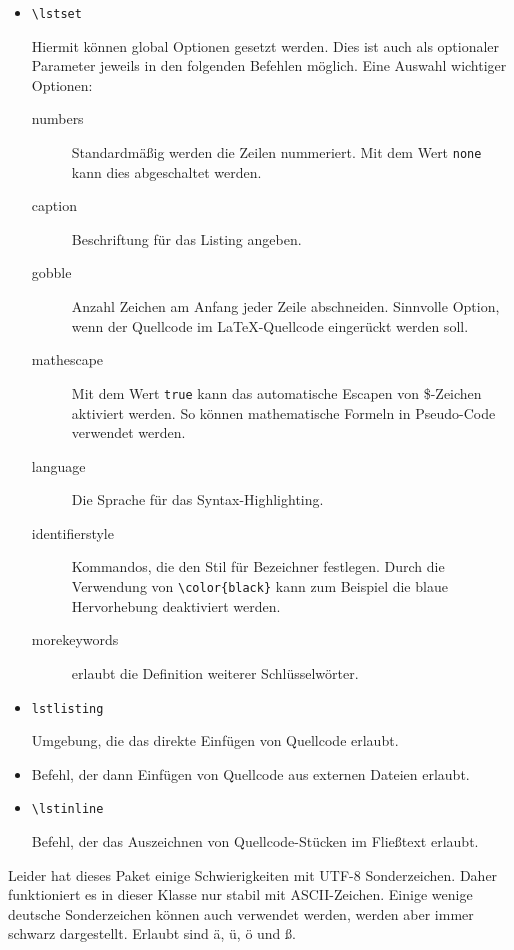 \documentclass{exercise}
\begin{document}
    \begin{itemize}
      \item \lstinline{\lstset}
      
        Hiermit können global Optionen gesetzt werden. Dies ist auch als
        optionaler Parameter jeweils in den folgenden Befehlen möglich. Eine
        Auswahl wichtiger Optionen:
        \begin{description}
          \item[numbers] Standardmäßig werden die Zeilen nummeriert. Mit dem
            Wert \texttt{none} kann dies abgeschaltet werden.
          \item[caption] Beschriftung für das Listing angeben.
          \item[gobble] Anzahl Zeichen am Anfang jeder Zeile abschneiden.
            Sinnvolle Option, wenn der Quellcode im
            \LaTeX{}-Quellcode eingerückt werden soll.
          \item[mathescape] Mit dem Wert \texttt{true} kann das automatische
            Escapen von \$-Zeichen aktiviert werden. So können mathematische
            Formeln in Pseudo-Code verwendet werden.
          \item[language] Die Sprache für das Syntax-Highlighting.
          \item[identifierstyle] Kommandos, die den Stil für Bezeichner
            festlegen. Durch die Verwendung von \lstinline!\color{black}!
            kann zum Beispiel die
            blaue Hervorhebung deaktiviert werden.
          \item[morekeywords] erlaubt die Definition weiterer Schlüsselwörter.
        \end{description}
        
      \item \lstinline{lstlisting}
        
        Umgebung, die das direkte Einfügen von Quellcode erlaubt.
      
      \item \lstinline{}
      
        Befehl, der dann Einfügen von Quellcode aus externen Dateien erlaubt.
      
      \item \lstinline{\lstinline}
      
        Befehl, der das Auszeichnen von Quellcode-Stücken im Fließtext erlaubt.
    \end{itemize}
    
    Leider hat dieses Paket einige Schwierigkeiten mit UTF-8 Sonderzeichen. Daher
    funktioniert es in dieser Klasse nur stabil mit ASCII-Zeichen. Einige wenige
    deutsche Sonderzeichen können auch verwendet werden, werden aber immer
    schwarz dargestellt. Erlaubt sind ä, ü, ö und ß.
    
\end{document}
